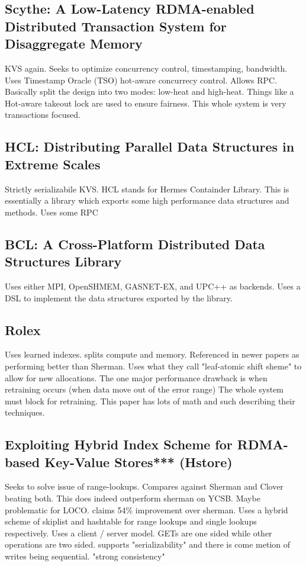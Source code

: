 \documentclass[sigplan,nonacm]{acmart}
\begin{document}
    
    \subsection{Scythe: A Low-Latency RDMA-enabled Distributed Transaction System for Disaggregate Memory }
    KVS again. Seeks to optimize concurrency control, timestamping, bandwidth. Uses Timestamp Oracle (TSO)
    hot-aware concurrecy control. Allows RPC. Basically split the design into two modes: low-heat and high-heat.
    Things like a Hot-aware takeout lock are used to ensure fairness. This whole system is very transactions focused. \cite{Lu-ACMtrans-2024}

    \subsection{HCL: Distributing Parallel Data Structures in Extreme Scales}
    Strictly serializabile KVS. HCL stands for Hermes Containder Library. This is essentially a library 
    which exports some high performance data structures and methods. Uses some RPC\cite{Devarajan-CLUSTER-2020}

    \subsection{BCL: A Cross-Platform Distributed Data Structures Library}
    Uses either MPI, OpenSHMEM, GASNET-EX, and UPC++ as backends. Uses a DSL to implement the data structures 
    exported by the library. \cite{Brock-ICPP-2019}
    
    \subsection{Rolex}
    Uses learned indexes. splits compute and memory. Referenced in newer papers as performing better than Sherman.
    Uses what they call "leaf-atomic shift sheme" to allow for new allocations. The one major performance drawback 
    is when retraining occurs (when data move out of the error range) The whole system must block for retraining. 
    This paper has lots of math and such describing their techniques. \cite{Li-FAST-2023}

    \subsection{Exploiting Hybrid Index Scheme for RDMA-based Key-Value Stores*** (Hstore)}
    Seeks to solve issue of range-lookups. Compares against Sherman and Clover beating both. 
    This does indeed outperform sherman on YCSB. Maybe problematic for LOCO. claims 54\% improvement 
    over sherman. Uses a hybrid scheme of skiplist and hashtable for range lookups and single lookups respectively.
    Uses a client / server model. GETs are one sided while other operations are two sided. supports "serializability"
    and there is come metion of writes being sequential. "strong consistency" \cite{Han-SYSTOR-2023}
\end{document}
